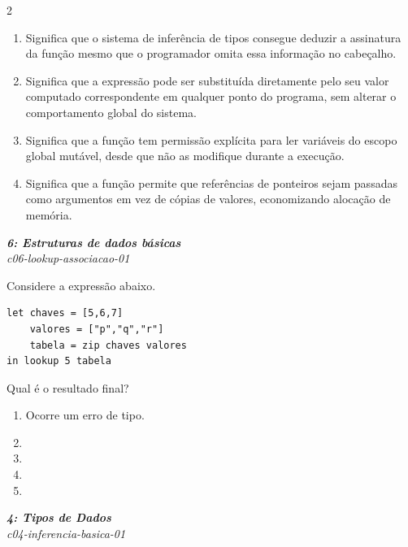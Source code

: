 \documentclass[a4paper,10pt,brazil]{article}
\begin{document}
\begin{multicols}{2}
\begin{enumerate}
  \item Significa que o sistema de inferência de tipos consegue deduzir a assinatura da função mesmo que o programador omita essa informação no cabeçalho.

  \item Significa que a expressão pode ser substituída diretamente pelo seu valor computado correspondente em qualquer ponto do programa, sem alterar o comportamento global do sistema.

  \item Significa que a função tem permissão explícita para ler variáveis do escopo global mutável, desde que não as modifique durante a execução.

  \item Significa que a função permite que referências de ponteiros sejam passadas como argumentos em vez de cópias de valores, economizando alocação de memória.


\end{enumerate}

\begin{flushright}
  \footnotesize
  \textit{\textbf{6: Estruturas de dados básicas}}\\
  \textit{c06-lookup-associacao-01}\\

\end{flushright}
Considere a expressão abaixo.
\begin{verbatim}
let chaves = [5,6,7]
    valores = ["p","q","r"]
    tabela = zip chaves valores
in lookup 5 tabela
\end{verbatim}
Qual é o resultado final?

\begin{enumerate}
  \item Ocorre um erro de tipo.

  \item {}

  \item {}

  \item {}

  \item {}


\end{enumerate}

\begin{flushright}
  \footnotesize
  \textit{\textbf{4: Tipos de Dados}}\\
  \textit{c04-inferencia-basica-01}\\


\end{flushright}
\end{multicols}
\end{document}
